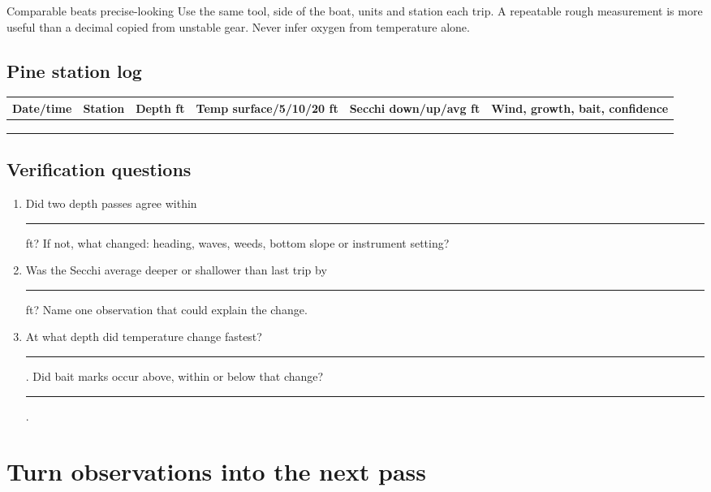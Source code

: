 \begin{telospanel}{Comparable beats precise-looking}
Use the same tool, side of the boat, units and station each trip. A repeatable
rough measurement is more useful than a decimal copied from unstable gear.
Never infer oxygen from temperature alone.
\end{telospanel}

\subsection{Pine station log}
\renewcommand{\arraystretch}{1.35}
\begin{tabularx}{\linewidth}{@{}p{.11\linewidth}p{.11\linewidth}p{.10\linewidth}
p{.13\linewidth}p{.13\linewidth}X@{}}
\toprule
Date/time & Station & Depth ft & Temp surface/5/10/20 ft & Secchi down/up/avg ft
& Wind, growth, bait, confidence\\
\midrule
\rule{0pt}{1.15cm}&&&&&\\ \midrule
\rule{0pt}{1.15cm}&&&&&\\ \midrule
\rule{0pt}{1.15cm}&&&&&\\
\bottomrule
\end{tabularx}
\renewcommand{\arraystretch}{1}

\subsection{Verification questions}
\begin{enumerate}
\item Did two depth passes agree within \rule{.45in}{.4pt} ft? If not, what
changed: heading, waves, weeds, bottom slope or instrument setting?
\item Was the Secchi average deeper or shallower than last trip by
\rule{.45in}{.4pt} ft? Name one observation that could explain the change.
\item At what depth did temperature change fastest? \rule{.7in}{.4pt}.
Did bait marks occur above, within or below that change? \rule{1in}{.4pt}.
\end{enumerate}

\newpage
\section{Turn observations into the next pass}

